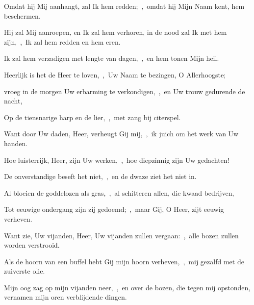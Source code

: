 \documentclass[12pt,twoside,a5paper]{article}
\begin{document}
\begin{halfparskip}

  Omdat hij Mij aanhangt, zal Ik hem redden;~\sep\ omdat hij Mijn Naam kent, hem beschermen.

  Hij zal Mij aanroepen, en Ik zal hem verhoren, in de nood zal Ik met hem zijn,~\sep\ Ik zal hem redden en hem eren.

  Ik zal hem verzadigen met lengte van dagen,~\sep\ en hem tonen Mijn heil.
\end{halfparskip}


\begin{halfparskip}

  Heerlijk is het de Heer te loven,~\sep\ Uw Naam te bezingen, O Allerhoogste;


  vroeg in de morgen Uw erbarming te verkondigen,~\sep\ en Uw trouw gedurende de nacht,

  Op de tiensnarige harp en de lier,~\sep\ met zang bij citerspel.

  Want door Uw daden, Heer, verheugt Gij mij,~\sep\ ik juich om het werk van Uw handen.
\end{halfparskip}

\begin{halfparskip}

  Hoe luisterrijk, Heer, zijn Uw werken,~\sep\ hoe diepzinnig zijn Uw gedachten!

  De onverstandige beseft het niet,~\sep\ en de dwaze ziet het niet in.

  Al bloeien de goddelozen als gras,~\sep\ al schitteren allen, die kwaad bedrijven,

  Tot eeuwige ondergang zijn zij gedoemd;~\sep\ maar Gij, O Heer, zijt eeuwig verheven.

  Want zie, Uw vijanden, Heer, Uw vijanden zullen vergaan:~\sep\ alle bozen zullen worden verstrooid.

  Als de hoorn van een buffel hebt Gij mijn hoorn verheven,~\sep\ mij gezalfd met de zuiverste olie.

  Mijn oog zag op mijn vijanden neer,~\sep\ en over de bozen, die tegen mij opstonden, vernamen mijn oren verblijdende dingen.
\end{halfparskip}
\end{document}
